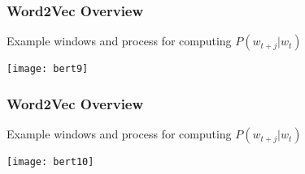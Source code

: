 \begin{frame}[fragile]\frametitle{Word2Vec Overview}
Example windows and process for computing  $P(w_{t+j}|w_t)$


\begin{center}
\texttt{[image: bert9]}
\end{center}	


\end{frame}

\begin{frame}[fragile]\frametitle{Word2Vec Overview}
Example windows and process for computing  $P(w_{t+j}|w_t)$


\begin{center}
\texttt{[image: bert10]}
\end{center}	


\end{frame}










